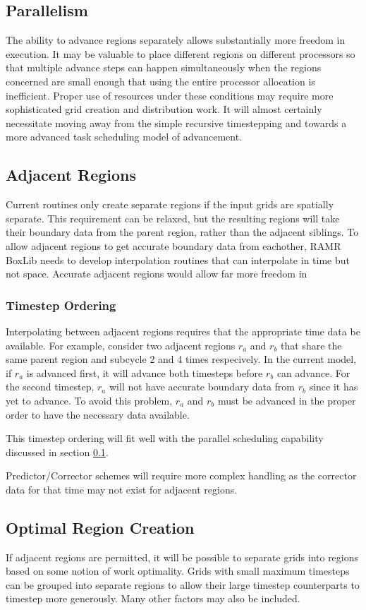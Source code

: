 \documentclass[11pt]{article}
\begin{document}
\subsection{Parallelism}
\label{parallel}

The ability to advance regions separately allows substantially more 
freedom in execution. It may be valuable to place different regions on 
different processors so that multiple advance steps can happen 
simultaneously when the regions concerned are small enough that using 
the entire processor allocation is inefficient. Proper use of 
resources under these conditions may require more sophisticated grid 
creation and distribution work. It will almost certainly necessitate 
moving away from the simple recursive timestepping and towards a more 
advanced task scheduling model of advancement.

\subsection{Adjacent Regions}

Current routines only create separate regions if the input grids are 
spatially separate. This requirement can be relaxed, but the 
resulting regions will take their boundary data from the parent 
region, rather than the adjacent siblings. To allow adjacent regions 
to get accurate boundary data from eachother, RAMR BoxLib needs to 
develop interpolation routines that can interpolate in time but not 
space. Accurate adjacent regions would allow far more freedom in 

\subsubsection{Timestep Ordering}
\label{timestep ordering}

Interpolating between adjacent regions requires that the appropriate 
time data be available. For example, consider two adjacent regions 
$r_a$ and $r_b$ that share the same parent region and subcycle 2 and 
4 times respecively. In the current model, if $r_a$ is advanced first, 
it will advance both timesteps before $r_b$ can advance. For the 
second timestep, $r_a$ will not have accurate boundary data from $r_b$ 
since it has yet to advance. To avoid this problem, $r_a$ and $r_b$ 
must be advanced in the proper order to have the necessary data 
available. 

This timestep ordering will fit well with the parallel scheduling 
capability discussed in section \ref{parallel}.

Predictor/Corrector schemes will require more complex handling as the 
corrector data for that time may not exist for adjacent regions.

\subsection{Optimal Region Creation}

If adjacent regions are permitted, it will be possible to separate 
grids into regions based on some notion of work optimality. Grids with 
small maximum timesteps can be grouped into separate regions to allow their 
large timestep counterparts to timestep more generously. Many other 
factors may also be included.
\end{document}
